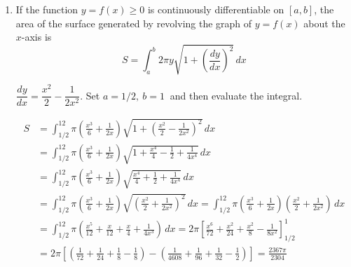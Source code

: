 \documentclass[a4paper, 12pt]{article}
\begin{document}
\begin{enumerate}[leftmargin=*,label=\textbf{\arabic*.}]
\begin{center}
\end{center}

We have the symmetry of the region that is bounded to the right of the $y$-axis. Therefore, it is not necessary to apply the method to the symmetrical region on the left. The volume of this solid is
\[\boxed{\begin{array}{l}\displaystyle\int_{\textstyle\frac{-1-\sqrt5}2}^{\textstyle\frac{1-\sqrt5}2}2\pi(-x)\left[\left(1-x\right)-\left(x^2\right)\right]\,dx\\\displaystyle+\int_{\textstyle\frac{1-\sqrt5}2}^02\pi(-x)\left[\left(1-x\right)-\left(1+x\right)\right]\,dx+\int_0^{\textstyle\frac{-1+\sqrt5}2}2\pi(x)\left[\left(1-x\right)-\left(x^2\right)\right]\,dx\end{array}}\]

\item If the function $y=f(x)\geq0$ is continuously differentiable on $[a,b]$, the area of the surface generated by revolving the graph of $y=f(x)$ about the $x$-axis is
\[S=\int_a^b2\pi y\sqrt{1+\left(\frac{dy}{dx}\right)^2}\,dx\]

$\dfrac{dy}{dx}=\dfrac{x^2}2-\dfrac1{2x^2}$. Set $a=1/2,\:b=1\:$ and then evaluate the integral.

\begin{align*}S&=\int_{1/2}^12\pi\left(\frac{x^3}6+\frac1{2x}\right)\sqrt{1+\left(\frac{x^2}2-\frac1{2x^2}\right)^2}\,dx\\[1em]&=\int_{1/2}^12\pi\left(\frac{x^3}6+\frac1{2x}\right)\sqrt{1+\frac{x^4}4-\frac12+\frac1{4x^4}}\,dx\\[1em]&=\int_{1/2}^12\pi\left(\frac{x^3}6+\frac1{2x}\right)\sqrt{\frac{x^4}4+\frac12+\frac1{4x^4}}\,dx\\[1em]&=\int_{1/2}^12\pi\left(\frac{x^3}6+\frac1{2x}\right)\sqrt{\left(\frac{x^2}2+\frac1{2x^2}\right)^2}\,dx=\int_{1/2}^12\pi\left(\frac{x^3}6+\frac1{2x}\right)\left(\frac{x^2}2+\frac1{2x^2}\right)\,dx\\[1em]&=\int_{1/2}^12\pi\left(\frac{x^5}{12}+\frac x{12}+\frac x4+\frac1{4x^3}\right)\,dx=2\pi\left[\frac{x^6}{72}+\frac{x^2}{24}+\frac{x^2}8-\frac1{8x^2}\right]_{1/2}^1\\[1em]&=2\pi\left[\left(\frac1{72}+\frac1{24}+\frac{1}8-\frac18\right)-\left(\frac1{4608}+\frac1{96}+\frac1{32}-\frac12\right)\right]=\boxed{\frac{2367\pi}{2304}}\end{align*}


\end{enumerate}
\end{document}
